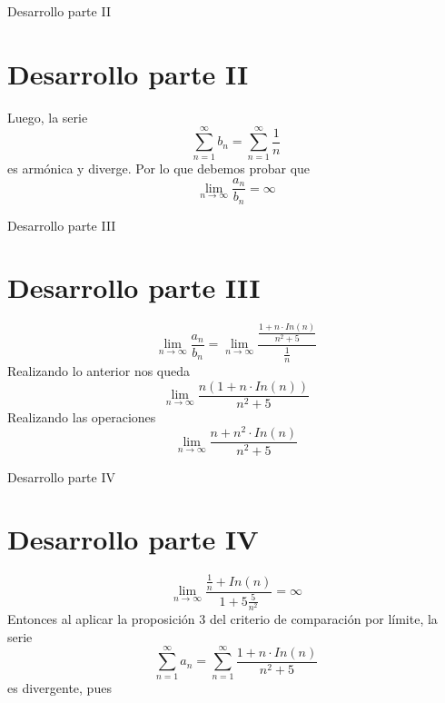 \documentclass{beamer}
\begin{document}
\begin{frame}{Desarrollo parte II}
    \section{Desarrollo parte II}
    Luego, la serie 
    \begin{equation*}
        \sum_{n=1}^{\infty}b_n = \sum_{n=1}^{\infty}\frac{1}{n}
    \end{equation*}
    es armónica y diverge.
    Por lo que debemos probar que 
    \begin{equation*}
        \lim_{n\rightarrow\infty}\frac{a_n}{b_n}=\infty
    \end{equation*}
\end{frame}


\begin{frame}{Desarrollo parte III}
    \section{Desarrollo parte III}
    \begin{equation*}
        \lim_{n\rightarrow\infty}\frac{a_n}{b_n}=\lim_{n\rightarrow\infty}\frac{\frac{1+n\cdot In(n)}{n^2+5}}{\frac{1}{n}}
    \end{equation*}
    Realizando lo anterior nos queda
    \begin{equation*}
        \lim_{n\rightarrow\infty}\frac{n(1+n\cdot In(n))}{n^2+5}
    \end{equation*}
    Realizando las operaciones
    \begin{equation*}
        \lim_{n\rightarrow\infty}\frac{n+n^2\cdot In(n)}{n^2+5}
    \end{equation*}
\end{frame}


\begin{frame}{Desarrollo parte IV}
    \section{Desarrollo parte IV}
    \begin{equation*}
        \lim_{n\rightarrow\infty}\frac{\frac{1}{n}+In(n)}{1+5 \frac{5}{n^2}} = \infty
    \end{equation*}
    Entonces al aplicar la proposición 3 del criterio de comparación por límite, la serie 
    \begin{equation*}
        \sum_{n=1}^{\infty}a_n = \sum_{n=1}^{\infty}\frac{1+n\cdot In(n)}{n^2+5}
    \end{equation*}
    es divergente, pues 
\end{frame}
\end{document}
